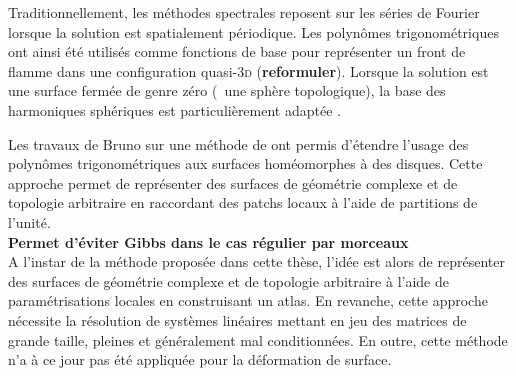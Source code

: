 Traditionnellement, les méthodes spectrales reposent sur les séries de Fourier lorsque la solution est spatialement périodique. 
Les polynômes trigonométriques ont ainsi été utilisés comme fonctions de base pour représenter un front de flamme dans une configuration quasi-3{\scshape d} \cite{gueyffier2015} (\textbf{reformuler}).
Lorsque la solution est une surface fermée de genre zéro (\ie\ une sphère topologique), la base des harmoniques sphériques est particulièrement adaptée \cite{veerapaneni2011}.\par
Les travaux de Bruno \cite{bruno2007} sur une méthode de  ont permis d'étendre l'usage des polynômes trigonométriques aux surfaces homéomorphes à des disques. 
Cette approche permet de représenter des surfaces de géométrie complexe et de topologie arbitraire en raccordant des patchs locaux à l'aide de partitions de l'unité.\\
\textbf{Permet d'éviter Gibbs dans le cas régulier par morceaux}\\
A l'instar de la méthode proposée dans cette thèse, l'idée est alors de représenter des surfaces de géométrie complexe et de topologie arbitraire à l'aide de paramétrisations locales en construisant un atlas. 
En revanche, cette approche nécessite la résolution de systèmes linéaires mettant en jeu des matrices de grande taille, pleines et généralement mal conditionnées. 
En outre, cette méthode n'a à ce jour pas été appliquée pour la déformation de surface.

